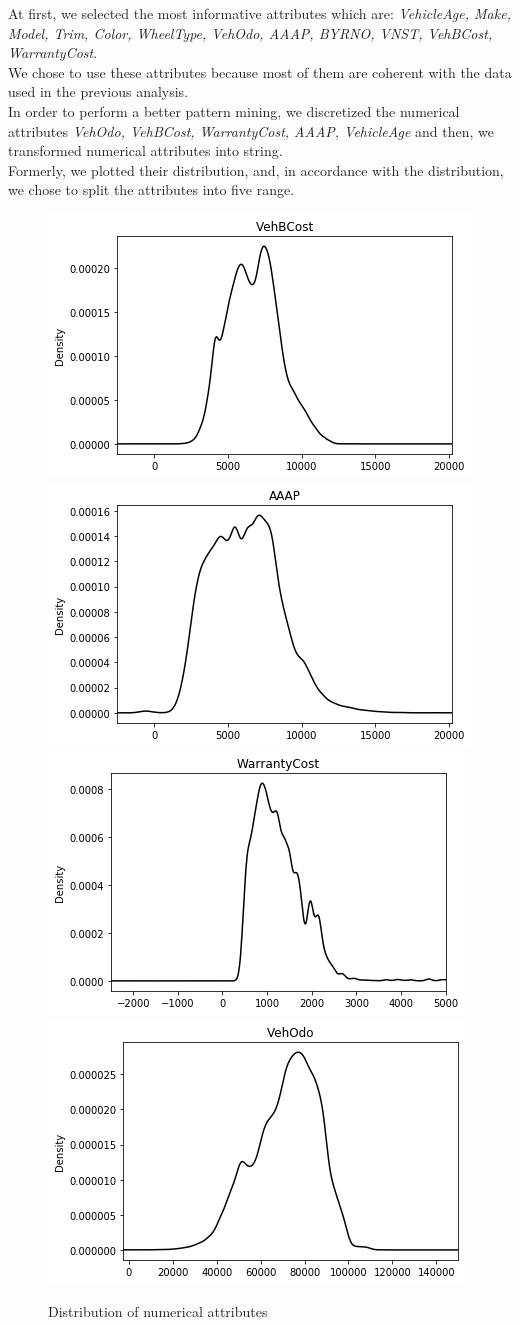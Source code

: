 \documentclass{article}
\begin{document}
	At first, we selected the most informative attributes which are: \emph{VehicleAge, Make, Model, Trim, Color, WheelType, VehOdo, AAAP, BYRNO, VNST, VehBCost, WarrantyCost}.\\
	We chose to use these attributes because most of them are coherent with the data used in the previous analysis.\\  
	In order to perform a better pattern mining, we discretized the numerical attributes \emph{VehOdo, VehBCost, WarrantyCost, AAAP, VehicleAge} and then, we transformed numerical attributes into string.\\
	Formerly, we plotted their distribution, and, in accordance with the distribution, we chose to split the attributes into five range.\\  
	
	\begin{figure}[H]
		\centering
		\includegraphics[width=.4\textwidth]{vehbcost}\hspace{1cm}
		\includegraphics[width=.4\textwidth]{AAAP}
		\includegraphics[width=.4\textwidth]{warrantycost}\hspace{1cm}
		\includegraphics[width=.4\textwidth]{vehodo}
		\caption{Distribution of numerical attributes}
		\label{fig:hyper_rf}
	\end{figure}
	
\end{document}
